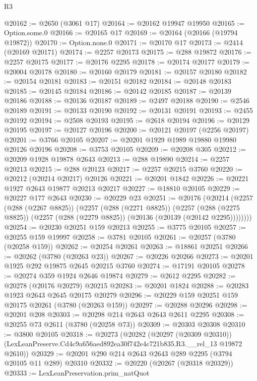 \begin{lexlean}{R3}
\begin{coremodule}
@20162 := @2650 (@3061 @17)
@20164 := @20162 @19947 @19950
@20165 := Option.some.{0}
@20166 := @20165 @17
@20169 := @20164 (@20166 (@19794 @19872))
@20170 := Option.none.{0}
@20171 := @20170 @17
@20173 := @2414 (@20169 @20171)
@20174 := @2257 @20173
@20175 := @288 @19872
@20176 := @2257 @20175
@20177 := @20176 @2295
@20178 := @20174 @20177
@20179 := @20004 @20178
@20180 := @20160 @20179
@20181 := @20157 @20180
@20182 := @20154 @20181
@20183 := @20151 @20182
@20184 := @20148 @20183
@20185 := @20145 @20184
@20186 := @20142 @20185
@20187 := @20139 @20186
@20188 := @20136 @20187
@20189 := @2497 @20188
@20190 := @2546 @20189
@20191 := @20133 @20190
@20192 := @20131 @20191
@20193 := @2455 @20192
@20194 := @2508 @20193
@20195 := @2618 @20194
@20196 := @20129 @20195
@20197 := @20127 @20196
@20200 := @20121 @20197 (@2256 @20197)
@20201 := @3766 @20105
@20207 := @20201 @1929 @1989 @19880 @19980 @20126 @20196
@20208 := @3753 @20105
@20209 := @20208 @305
@20212 := @20209 @1928 @19878 @2643
@20213 := @288 @19890
@20214 := @2257 @20213
@20215 := @288 @20123
@20217 := @2257 @20215 @3760
@20220 := @20212 (@20214 @20217) @20126
@20221 := @20201 @1842
@20226 := @20221 @1927 @2643 @19877 @20213 @20217
@20227 := @18810 @20105
@20229 := @20227 @177 @2643
@20230 := @20229 @23
@20251 := @20176
    (@20214
      (@2257
        (@288 (@2267 @8825))
        (@2257
          (@288 (@2271 @8825))
          (@2257
            (@288 (@2275 @8825))
            (@2257 (@288 (@2279 @8825)) (@20136 (@20139 (@20142 @2295))))))))
@20254 := @20230 @20251 @159 @20213
@20255 := @3775 @20105
@20257 := @20255 @159 @19997
@20258 := @3781 @20105
@20261 := @20257 (@3780 (@20258 @159))
@20262 := @20254 @20261
@20263 := @18861 @20251
@20266 := @20262 (@3780 (@20263 @23))
@20267 := @20226 @20266
@20273 := @20201 @1925 @292 @19875 @2645 @20215 @3760
@20274 := @17191 @20105
@20278 := @20274 @359 @1924 @2646 @19874
@20279 := @2612 @2295
@20282 := @20278 (@20176 @20279) @20215
@20283 := @20201 @1824
@20288 := @20283 @1923 @2643 @2645 @20175 @20279
@20296 := @20229 @159 @20251 @159 @20175 @20261 (@3780 (@20263 @159))
@20297 := @20288 @20296
@20298 := @20201 @208
@20303 := @20298 @214 @2643 @2643 @2611 @2295
@20308 := @20255 @73 @2611 (@3780 (@20258 @73))
@20309 := @20303 @20308
@20310 := @3800 @20105
@20318 := @20273
    (@20282
      (@20297 (@20309 @20310))
      (LexLeanPreserve.Cd4c9a656aed892ea30f742e4c721b835.R3.__rel_13 @19872 @2610))
@20329 := @20201 @290 @214 @2643 @2643 @289 @2295 (@3794 @20105 @11 @289) @20310
@20332 := @20220 (@20267 (@20318 @20329))
@20333 := LexLeanPreservation.prim_natQuot

\end{coremodule}
\end{lexlean}
